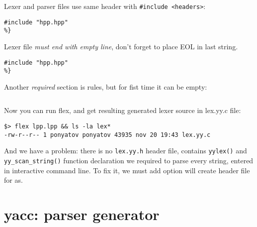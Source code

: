 Lexer and parser files use same header with \verb|#include <headers>|:
\begin{lstlisting}[title={lpp.lpp}]
%{
#include "hpp.hpp"
%}
\end{lstlisting}
Lexer file \emph{must end with empty line}, don't forget to place EOL in last
string.
\begin{lstlisting}[title={ypp.ypp}]
%{
#include "hpp.hpp"
%}
\end{lstlisting}

\clearpage
Another \emph{required} section is rules, but for fist time it can be empty:
\begin{lstlisting}[title={lpp.lpp}]
%%
\end{lstlisting}

\noindent
Now you can run flex, and get resulting generated lexer source in lex.yy.c file:
\begin{lstlisting}
$> flex lpp.lpp && ls -la lex*
-rw-r--r-- 1 ponyatov ponyatov 43935 nov 20 19:43 lex.yy.c
\end{lstlisting}
And we have a problem: there is no \verb|lex.yy.h| header file, contains
\verb|yylex()| and \verb|yy_scan_string()| function declaration we required to
parse every string, entered in interactive command line. To fix it, we must add option will create header file for as.

\section{yacc: parser generator}
